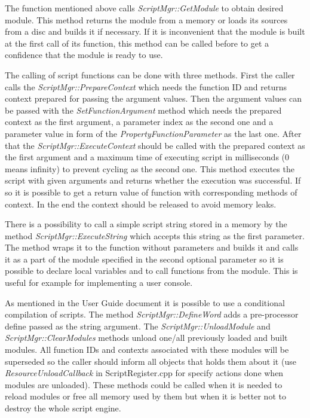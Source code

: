 \documentclass[a4paper, 12pt]{report}
\begin{document}
The function mentioned above calls \emph{ScriptMgr::GetModule} to obtain desired module. This method returns the module from a memory or loads its sources from a disc and builds it if necessary. If it is inconvenient that the module is built at the first call of its function, this method can be called before to get a confidence that the module is ready to use.

The calling of script functions can be done with three methods. First the caller calls the \emph{ScriptMgr::PrepareContext} which needs the function ID and returns context prepared for passing the argument values. Then the argument values can be passed with the \emph{SetFunctionArgument} method which needs the prepared context as the first argument, a parameter index as the second one and a parameter value in form of the \emph{PropertyFunctionParameter} as the last one. After that the \emph{ScriptMgr::ExecuteContext} should be called with the prepared context as the first argument and a maximum time of executing script in milliseconds (0 means infinity) to prevent cycling as the second one. This method executes the script with given arguments and returns whether the execution was successful. If so it is possible to get a return value of function with corresponding methods of context. In the end the context should be released to avoid memory leaks.

There is a possibility to call a simple script string stored in a memory by the method \emph{ScriptMgr::ExecuteString} which accepts this string as the first parameter. The method wraps it to the function without parameters and builds it and calls it as a part of the module specified in the second optional parameter so it is possible to declare local variables and to call functions from the module. This is useful for example for implementing a user console.

As mentioned in the User Guide document
it is possible to use a conditional compilation of scripts. The method \emph{ScriptMgr::DefineWord} adds a pre-processor define passed as the string argument. The \emph{ScriptMgr::\-Unload\-Module} and \emph{ScriptMgr::ClearModules} methods unload one/all previously loaded and built modules. All function IDs and contexts associated with these modules will be superseded so the caller should inform all objects that holds them about it (use \emph{ResourceUnloadCallback} in ScriptRegister.cpp for specify actions done when modules are unloaded). These methods could be called when it is needed to reload modules or free all memory used by them but when it is better not to destroy the whole script engine.
\end{document}
